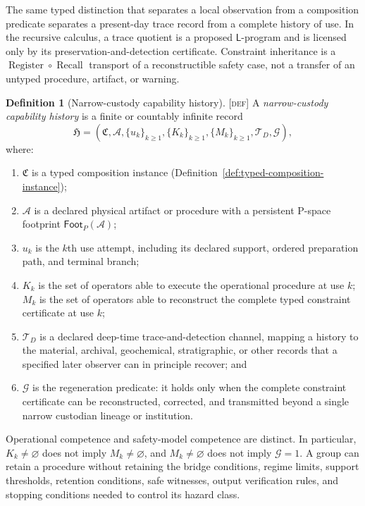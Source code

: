 \documentclass[11pt]{article}
\newcommand{\Register}{\ensuremath{\operatorname{Register}}}
\newcommand{\Recall}{\ensuremath{\operatorname{Recall}}}
\newcommand{\LOp}{\ensuremath{\mathsf{L}}}
\newcommand{\Defn}{\textsc{[def]}}
\theoremstyle{definition}
\newtheorem{sdefinition}{Definition}
\begin{document}
The same typed distinction that separates a local observation from a composition
predicate separates a present-day trace record from a complete history of use.
In the recursive calculus, a trace quotient is a proposed $\LOp$-program and is
licensed only by its preservation-and-detection certificate. Constraint inheritance
is a $\Register\circ\Recall$ transport of a reconstructible safety case, not a
transfer of an untyped procedure, artifact, or warning.

\begin{sdefinition}[Narrow-custody capability history]
\label{def:narrow-custody-history}
\Defn{} A \emph{narrow-custody capability history} is a finite or countably
infinite record
\begin{equation}
\mathfrak H=
\left(
\mathfrak C,\mathcal A,\{u_k\}_{k\geq 1},\{K_k\}_{k\geq 1},
\{M_k\}_{k\geq 1},\mathcal T_D,\mathcal G
\right),
\label{eq:narrow-custody-history}
\end{equation}
where:
\begin{enumerate}
\item $\mathfrak C$ is a typed composition instance
(Definition~\ref{def:typed-composition-instance});

\item $\mathcal A$ is a declared physical artifact or procedure with a
persistent P-space footprint $\mathsf{Foot}_P(\mathcal A)$;

\item $u_k$ is the $k$th use attempt, including its declared support,
ordered preparation path, and terminal branch;

\item $K_k$ is the set of operators able to execute the operational procedure at
use $k$; $M_k$ is the set of operators able to reconstruct the complete typed
constraint certificate at use $k$;

\item $\mathcal T_D$ is a declared deep-time trace-and-detection channel, mapping
a history to the material, archival, geochemical, stratigraphic, or other records
that a specified later observer can in principle recover; and

\item $\mathcal G$ is the regeneration predicate: it holds only when the complete
constraint certificate can be reconstructed, corrected, and transmitted beyond a
single narrow custodian lineage or institution.
\end{enumerate}

Operational competence and safety-model competence are distinct. In particular,
$K_k\neq\varnothing$ does not imply $M_k\neq\varnothing$, and $M_k\neq\varnothing$
does not imply $\mathcal G=1$. A group can retain a procedure without retaining
the bridge conditions, regime limits, support thresholds, retention conditions,
safe witnesses, output verification rules, and stopping conditions needed to
control its hazard class.
\end{sdefinition}
\end{document}
